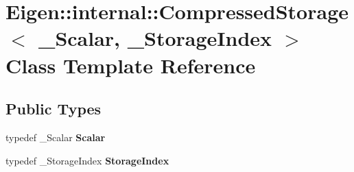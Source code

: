 \hypertarget{class_eigen_1_1internal_1_1_compressed_storage}{}\section{Eigen\+::internal\+::Compressed\+Storage$<$ \+\_\+\+Scalar, \+\_\+\+Storage\+Index $>$ Class Template Reference}
\label{class_eigen_1_1internal_1_1_compressed_storage}
\subsection*{Public Types}
\begin{DoxyCompactItemize}
\item 
\mbox{\label{class_eigen_1_1internal_1_1_compressed_storage_a6714e298df525bf3e02d175b08cd6cba}} 
typedef \+\_\+\+Scalar {\bfseries Scalar}
\item 
\mbox{\label{class_eigen_1_1internal_1_1_compressed_storage_ad2b97b9facd3f5d9735f0dfc062e31de}} 
typedef \+\_\+\+Storage\+Index {\bfseries Storage\+Index}
\end{DoxyCompactItemize}
